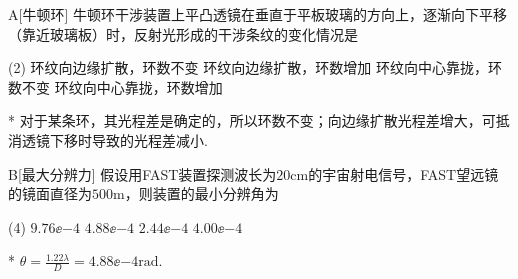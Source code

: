 \begin{choice}{A}[牛顿环]
    牛顿环干涉装置上平凸透镜在垂直于平板玻璃的方向上，逐渐向下平移（靠近玻璃板）时，反射光形成的干涉条纹的变化情况是
    \begin{tasks}(2)
        \task 环纹向边缘扩散，环数不变
        \task 环纹向边缘扩散，环数增加
        \task 环纹向中心靠拢，环数不变
        \task 环纹向中心靠拢，环数增加
    \end{tasks}
\end{choice}
\begin{solution}*
    对于某条环，其光程差是确定的，所以环数不变；向边缘扩散光程差增大，可抵消透镜下移时导致的光程差减小.
\end{solution}

\begin{choice}{B}[最大分辨力]
    假设用FAST装置探测波长为$20\mathrm{cm}$的宇宙射电信号，FAST望远镜的镜面直径为$500\mathrm{m}$，则装置的最小分辨角为
\begin{tasks}(4)
    \task $9.76\ee{-4}$
    \task $4.88\ee{-4}$
    \task $2.44\ee{-4}$
    \task $4.00\ee{-4}$
\end{tasks}
\end{choice}
\begin{solution}*
    $\theta=\frac{1.22\lambda}{D}=4.88\ee{-4}\mathrm{rad}$.
\end{solution}

